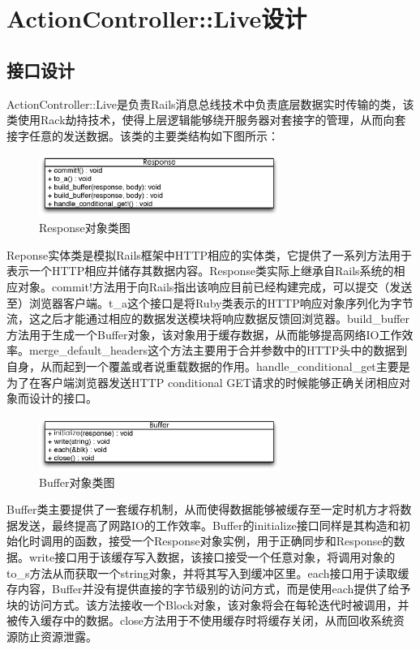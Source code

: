 \section{ActionController::Live设计}
\subsection{接口设计}
ActionController::Live是负责Rails消息总线技术中负责底层数据实时传输的类，该类使用Rack劫持技术，使得上层逻辑能够绕开服务器对套接字的管理，从而向套接字任意的发送数据。该类的主要类结构如下图所示：

\begin{figure}[h]
\centering
\includegraphics[width=0.7\textwidth]{images/detail/response_class.eps}
\caption{Response对象类图}
\label{fig-response-class}
\end{figure}

Reponse实体类是模拟Rails框架中HTTP相应的实体类，它提供了一系列方法用于表示一个HTTP相应并储存其数据内容。Response类实际上继承自Rails系统的相应对象。commit!方法用于向Rails指出该响应目前已经构建完成，可以提交（发送至）浏览器客户端。t\_a这个接口是将Ruby类表示的HTTP响应对象序列化为字节流，这之后才能通过相应的数据发送模块将响应数据反馈回浏览器。build\_buffer方法用于生成一个Buffer对象，该对象用于缓存数据，从而能够提高网络IO工作效率。merge\_default\_headers这个方法主要用于合并参数中的HTTP头中的数据到自身，从而起到一个覆盖或者说重载数据的作用。handle\_conditional\_get主要是为了在客户端浏览器发送HTTP conditional GET请求的时候能够正确关闭相应对象而设计的接口。

\begin{figure}[h]
\centering
\includegraphics[width=0.7\textwidth]{images/detail/buffer_class.eps}
\caption{Buffer对象类图}
\label{fig-buffer-class}
\end{figure}

Buffer类主要提供了一套缓存机制，从而使得数据能够被缓存至一定时机方才将数据发送，最终提高了网路IO的工作效率。Buffer的initialize接口同样是其构造和初始化时调用的函数，接受一个Response对象实例，用于正确同步和Response的数据。write接口用于该缓存写入数据，该接口接受一个任意对象，将调用对象的to\_s方法从而获取一个string对象，并将其写入到缓冲区里。each接口用于读取缓存内容，Buffer并没有提供直接的字节级别的访问方式，而是使用each提供了给予块的访问方式。该方法接收一个Block对象，该对象将会在每轮迭代时被调用，并被传入缓存中的数据。close方法用于不使用缓存时将缓存关闭，从而回收系统资源防止资源泄露。


